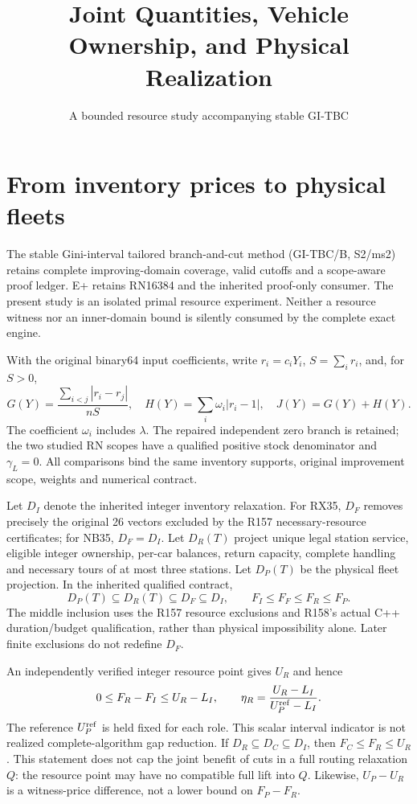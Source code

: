 \documentclass[11pt]{article}
\title{Joint Quantities, Vehicle Ownership, and Physical Realization}
\author{A bounded resource study accompanying stable GI-TBC}
\date{}
\begin{document}
\maketitle

\section{From inventory prices to physical fleets}
The stable Gini-interval tailored branch-and-cut method (GI-TBC/B, S2/ms2)
retains complete improving-domain coverage, valid cutoffs and a scope-aware
proof ledger. E+ retains RN16384 and the inherited proof-only consumer.
The present study is an isolated primal resource experiment. Neither a
resource witness nor an inner-domain bound is silently consumed by the
complete exact engine.

With the original binary64 input coefficients, write $r_i=c_iY_i$,
$S=\sum_i r_i$, and, for $S>0$,
\[
 G(Y)=\frac{\sum_{i<j}|r_i-r_j|}{nS},\quad
 H(Y)=\sum_i\omega_i|r_i-1|,\quad J(Y)=G(Y)+H(Y).
\]
The coefficient $\omega_i$ includes $\lambda$. The repaired independent zero
branch is retained; the two studied RN scopes have a qualified positive
stock denominator and $\gamma_L=0$. All comparisons bind the same inventory
supports, original improvement scope, weights and numerical contract.

Let $D_I$ denote the inherited integer inventory relaxation. For RX35,
$D_F$ removes precisely the original 26 vectors excluded by the R157
necessary-resource certificates; for NB35, $D_F=D_I$. Let $D_R(T)$ project
unique legal station service, eligible integer ownership, per-car balances,
return capacity, complete handling and necessary tours of at most three
stations. Let $D_P(T)$ be the physical fleet projection. In the inherited
qualified contract,
\[
 D_P(T)\subseteq D_R(T)\subseteq D_F\subseteq D_I,
 \qquad F_I\le F_F\le F_R\le F_P.
\]
The middle inclusion uses the R157 resource exclusions and R158's actual
C++ duration/budget qualification, rather than physical impossibility alone.
Later finite exclusions do not redefine $D_F$.

An independently verified integer resource point gives $U_R$ and hence
\[
 0\le F_R-F_I\le U_R-L_I,\qquad
 \eta_R=\frac{U_R-L_I}{U_P^{\rm ref}-L_I}.
\]
The reference $U_P^{\rm ref}$ is held fixed for each role. This scalar
interval indicator is not realized complete-algorithm gap reduction.
If $D_R\subseteq D_C\subseteq D_I$, then $F_C\le F_R\le U_R$.
This statement does not cap the joint benefit of cuts in a full routing
relaxation $Q$: the resource point may have no compatible full lift into $Q$.
Likewise, $U_P-U_R$ is a witness-price difference, not a lower bound on
$F_P-F_R$.
\end{document}
